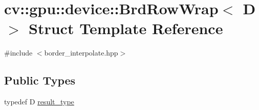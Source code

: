 \hypertarget{structcv_1_1gpu_1_1device_1_1BrdRowWrap}{\section{cv\-:\-:gpu\-:\-:device\-:\-:Brd\-Row\-Wrap$<$ D $>$ Struct Template Reference}
\label{structcv_1_1gpu_1_1device_1_1BrdRowWrap}
}


{\ttfamily \#include $<$border\-\_\-interpolate.\-hpp$>$}

\subsection*{Public Types}
\begin{DoxyCompactItemize}
\item 
typedef D \hyperlink{structcv_1_1gpu_1_1device_1_1BrdRowWrap_a7e5536bc92be53562a1dd66281413b45}{result\-\_\-type}
\end{DoxyCompactItemize}
